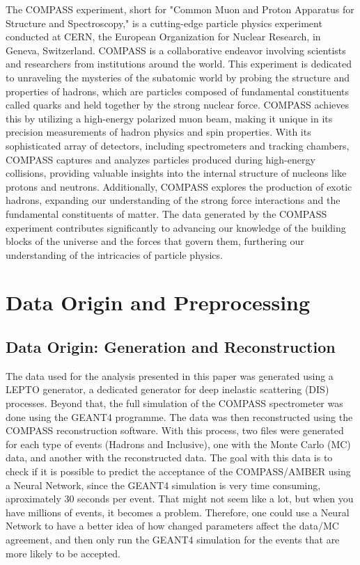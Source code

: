 \documentclass{article}
\begin{document}
The COMPASS experiment, short for "Common Muon and Proton Apparatus for Structure 
and Spectroscopy," is a cutting-edge particle physics experiment conducted at CERN, 
the European Organization for Nuclear Research, in Geneva, Switzerland. COMPASS is a 
collaborative endeavor involving scientists and researchers from institutions around the world.
This experiment is dedicated to unraveling the mysteries of the subatomic world by probing the 
structure and properties of hadrons, which are particles composed of fundamental constituents 
called quarks and held together by the strong nuclear force. COMPASS achieves this by utilizing 
a high-energy polarized muon beam, making it unique in its precision measurements of hadron 
physics and spin properties.
With its sophisticated array of detectors, including spectrometers and tracking chambers, 
COMPASS captures and analyzes particles produced during high-energy collisions, providing 
valuable insights into the internal structure of nucleons like protons and neutrons. 
Additionally, COMPASS explores the production of exotic hadrons, expanding our understanding 
of the strong force interactions and the fundamental constituents of matter.
The data generated by the COMPASS experiment contributes significantly to advancing our 
knowledge of the building blocks of the universe and the forces that govern them, 
furthering our understanding of the intricacies of particle physics.


\section{Data Origin and Preprocessing}

\subsection{Data Origin: Generation and Reconstruction}
The data used for the analysis presented in this paper was generated using a LEPTO generator,
a dedicated generator for deep inelastic scattering (DIS) processes. Beyond that, the full simulation
of the COMPASS spectrometer was done using the GEANT4 programme. The data was then reconstructed
using the COMPASS reconstruction software. With this process, two files were generated for each type of events (Hadrons and Inclusive), one with the
Monte Carlo (MC) data, and another with the reconstructed data. 
The goal with this data is to check if it is possible to predict the acceptance of the COMPASS/AMBER
using a Neural Network, since the GEANT4 simulation is very time consuming, aproximately 30 seconds per event.
That might not seem like a lot, but when you have millions of events, it becomes a problem.
Therefore, one could use a Neural Network to have a better idea of how changed parameters affect the data/MC
agreement, and then only run the GEANT4 simulation for the events that are more likely to be accepted.
\end{document}
